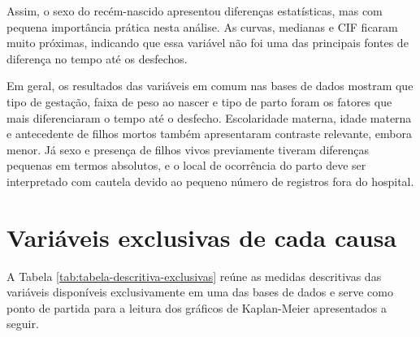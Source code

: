 Assim, o sexo do recém-nascido apresentou diferenças estatísticas, mas com
pequena importância prática nesta análise. As curvas, medianas e CIF ficaram
muito próximas, indicando que essa variável não foi uma das principais fontes de
diferença no tempo até os desfechos.

Em geral, os resultados das variáveis em comum nas bases de dados mostram que tipo de gestação,
faixa de peso ao nascer e tipo de parto foram os fatores que mais diferenciaram o
tempo até o desfecho. Escolaridade materna, idade materna e antecedente de filhos
mortos também apresentaram contraste relevante, embora menor. Já sexo e presença
de filhos vivos previamente tiveram diferenças pequenas em termos absolutos, e o
local de ocorrência do parto deve ser interpretado com cautela devido ao pequeno
número de registros fora do hospital.

\section{Variáveis exclusivas de cada causa}

A Tabela \ref{tab:tabela-descritiva-exclusivas} reúne as medidas descritivas das
variáveis disponíveis exclusivamente em uma das bases de dados e serve como ponto de partida para 
a leitura dos gráficos de Kaplan-Meier apresentados a seguir.

